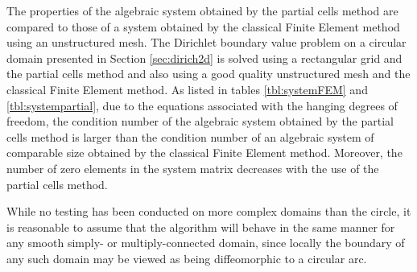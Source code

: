\documentclass[12pt,twoside]{article}
\begin{document}
\par
The properties of the algebraic system obtained by the partial cells method are compared to those of a system obtained by the classical Finite Element method using an unstructured mesh. The Dirichlet boundary value problem on a circular domain presented in Section \ref{sec:dirich2d} is solved using a rectangular grid and the partial cells method and also using a good quality unstructured mesh and the classical Finite Element method. As listed in tables \ref{tbl:systemFEM} and \ref{tbl:systempartial}, due to the equations associated with the hanging degrees of freedom, the condition number of the algebraic system obtained by the partial cells method is larger than the condition number of an algebraic system of comparable size obtained by the classical Finite Element method. Moreover, the number of zero elements in the system matrix decreases with the use of the partial cells method.
\par 
While no testing has been conducted on more complex domains than the
circle, it is reasonable to assume that the algorithm will behave in
the same manner for any smooth simply- or multiply-connected domain,
since locally the boundary of any such domain may be viewed as being
diffeomorphic to a circular arc. 
%
\newpage
\end{document}
